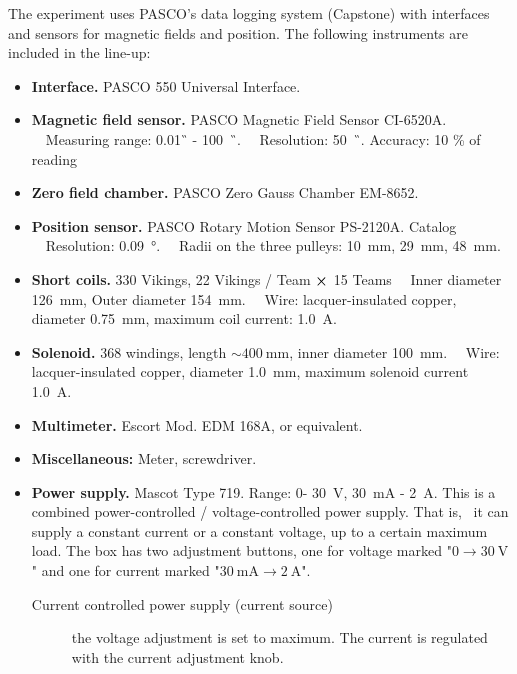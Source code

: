 \documentclass[../Elmag-labhefte-2020.tex]{subfiles}
\begin{document}
The experiment uses PASCO's data logging system (Capstone) with interfaces and sensors for magnetic fields and position.
The following instruments are included in the line-up:
\vspace{-4mm}
\begin{itemize}
    \item \textbf{Interface.} PASCO 550 Universal Interface.
    \item \textbf{Magnetic field sensor.} PASCO Magnetic Field Sensor CI-6520A. \ \
    Measuring range: \SI{0,01}{\G} - \SI{100}{\kilo\G}. \ \
    Resolution: \SI{50}{\milli\G}.
    Accuracy: 10 \% of reading
    \item \textbf{Zero field chamber.} PASCO Zero Gauss Chamber EM-8652.
    \item \textbf{Position sensor.} PASCO Rotary Motion Sensor PS-2120A. Catalog \ \
    Resolution: \SI{0,09}{\degree}. \ \
    Radii on the three pulleys: \SI{10}{\mm}, \SI{29}{\mm}, \SI{48}{\mm}.
    \item \textbf{Short coils.} 330 Vikings, 22 Vikings / Team $\cross$ 15 Teams \ \
    Inner diameter \SI{126}{\mm}, Outer diameter \SI{154}{\mm}. \ \
    Wire: lacquer-insulated copper, diameter \SI{0,75}{\mm}, maximum coil current: \SI{1,0}{\ampere}.
    \item \textbf{Solenoid.} 368 windings, length $\sim \SI{400}{\mm}$, inner diameter \SI{100}{\mm}. \ \
    Wire: lacquer-insulated copper, diameter \SI{1,0}{\mm}, maximum solenoid current \SI{1,0}{\ampere}.
    \item \textbf{Multimeter.} Escort Mod. EDM 168A, or equivalent.
    \item \textbf{Miscellaneous:} Meter, screwdriver.
    \item \textbf{Power supply.} Mascot Type 719. Range: 0- \SI{30}{\volt}, \SI{30}{\milli\ampere} - \SI{2}{\ampere}. \label{magnetfelt.kraftforsyning}
    This is a combined power-controlled / voltage-controlled power supply. That is, \ it can supply a constant current or a constant voltage, up to a certain maximum load. The box has two adjustment buttons, one for voltage marked "$0 \rightarrow \SI{30}{\volt}$" and one for current marked "$\SI{30}{\milli\ampere} \rightarrow \SI{2}{\ampere}$".
    \begin{description}
      \item[Current controlled power supply (current source)] the voltage adjustment is set to maximum. The current is regulated with the current adjustment knob.

\end{description}
\end{itemize}
\end{document}
